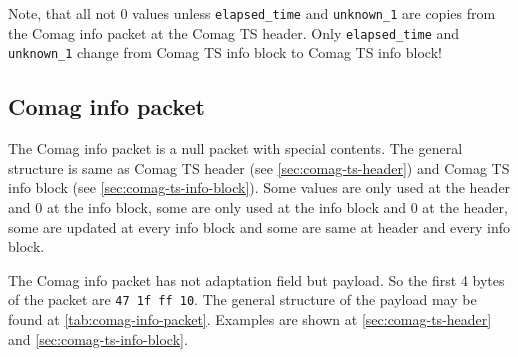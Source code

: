 \documentclass{scrartcl}
\begin{document}
Note, that all not 0 values unless \texttt{elapsed\_time} and
\texttt{unknown\_1} are copies from the Comag info packet at the Comag TS
header. Only \texttt{elapsed\_time} and \texttt{unknown\_1} change from Comag
TS info block to Comag TS info block!


\subsection{Comag info packet}

The Comag info packet is a null packet with special contents. The general
structure is same as Comag TS header (see \autoref{sec:comag-ts-header}) and
Comag TS info block (see \autoref{sec:comag-ts-info-block}). Some values are
only used at the header and 0 at the info block, some are only used at the
info block and 0 at the header, some are updated at every info block and some
are same at header and every info block.

The Comag info packet has not adaptation field but payload. So the first 4
bytes of the packet are \texttt{47 1f ff 10}. The general structure of the
payload may be found at \autoref{tab:comag-info-packet}. Examples are shown at
\autoref{sec:comag-ts-header} and \autoref{sec:comag-ts-info-block}.
\end{document}
